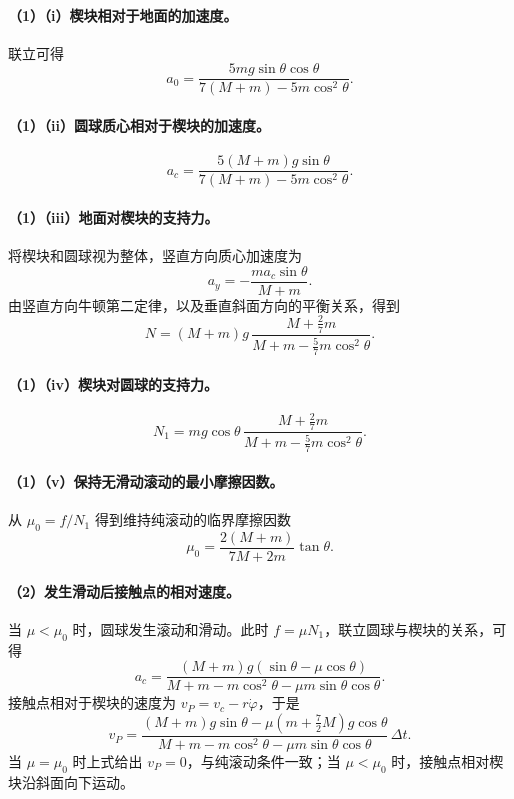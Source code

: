 \paragraph{（1）（i）楔块相对于地面的加速度。}
联立可得
\[
a_0=\boxed{\frac{5mg\sin\theta\cos\theta}
{7(M+m)-5m\cos^2\theta}}.
\]

\paragraph{（1）（ii）圆球质心相对于楔块的加速度。}
\[
a_c=\frac{5(M+m)g\sin\theta}
{7(M+m)-5m\cos^2\theta}.
\]

\paragraph{（1）（iii）地面对楔块的支持力。}
将楔块和圆球视为整体，竖直方向质心加速度为
\[
a_y=-\frac{ma_c\sin\theta}{M+m}.
\]
由竖直方向牛顿第二定律，以及垂直斜面方向的平衡关系，得到
\[
N=(M+m)g\,
\frac{M+\frac27m}{M+m-\frac57m\cos^2\theta}.
\]

\paragraph{（1）（iv）楔块对圆球的支持力。}
\[
N_1=mg\cos\theta\,
\frac{M+\frac27m}{M+m-\frac57m\cos^2\theta}.
\]
\paragraph{（1）（v）保持无滑动滚动的最小摩擦因数。}
从 $\mu_0=f/N_1$ 得到维持纯滚动的临界摩擦因数
\[
\mu_0=\frac{2(M+m)}{7M+2m}\tan\theta.
\]

\paragraph{（2）发生滑动后接触点的相对速度。}
当 $\mu<\mu_0$ 时，圆球发生滚动和滑动。此时 $f=\mu N_1$，联立圆球与楔块的关系，可得
\[
a_c=\frac{(M+m)g(\sin\theta-\mu\cos\theta)}
{M+m-m\cos^2\theta-\mu m\sin\theta\cos\theta}.
\]
接触点相对于楔块的速度为 $v_P=v_c-r\dot\varphi$，于是
\[
v_P=
\frac{(M+m)g\sin\theta-\mu\left(m+\frac72M\right)g\cos\theta}
{M+m-m\cos^2\theta-\mu m\sin\theta\cos\theta}\,\Delta t.
\]
当 $\mu=\mu_0$ 时上式给出 $v_P=0$，与纯滚动条件一致；当 $\mu<\mu_0$ 时，接触点相对楔块沿斜面向下运动。
